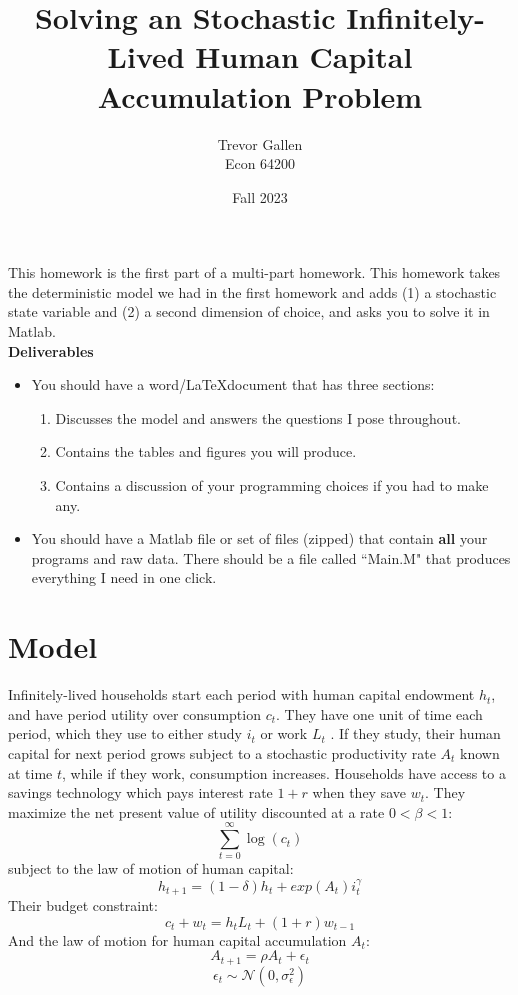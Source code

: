 \documentclass[11pt]{article}
\title{Solving an Stochastic Infinitely-Lived Human Capital Accumulation Problem}
\author{ Trevor Gallen \\ Econ 64200 }
\date{Fall 2023}
\begin{document}


\maketitle

This homework is the first part of a multi-part homework.  This homework takes the deterministic model we had in the first homework and adds (1) a stochastic state variable and (2) a second dimension of choice, and asks you to solve it in Matlab.\\

\textbf{Deliverables}
\begin{itemize}
\item You should have a word/\LaTeX document that has three sections: 
\begin{enumerate}
\item Discusses the model and answers the questions I pose throughout.
\item Contains the tables and figures you will produce.
\item Contains a discussion of your programming choices if you had to make any.
\end{enumerate}
\item You should have a Matlab file or set of files (zipped) that contain \textbf{all} your programs and raw data.  There should be a file called ``Main.M" that produces everything I need in one click.
\end{itemize}


\section{Model}
Infinitely-lived households start each period with human capital endowment $h_t$, and have period utility over consumption $c_t$.  They have one unit of time each period, which they use to either study $i_t$ or work $L_t$ . If they study, their human capital for next period grows subject to a stochastic productivity rate $A_t$ known at time $t$, while if they work, consumption increases.  Households have access to a savings technology which pays interest rate $1+r$ when they save $w_t$.  They maximize the net present value of utility discounted at a rate $0<\beta<1$:
$$\sum_{t=0}^\infty \log(c_t)$$
subject to the law of motion of human capital:
$$h_{t+1}=(1-\delta)h_t+exp(A_t)i_t^\gamma$$
Their budget constraint:
$$c_t+w_t=h_tL_t+(1+r)w_{t-1}$$
And the law of motion for human capital accumulation $A_t$:
$$A_{t+1}=\rho A_t+\epsilon_t$$
$$\epsilon_t\sim \mathcal{N}\left(0,\sigma^2_\epsilon\right)$$
\end{document}
